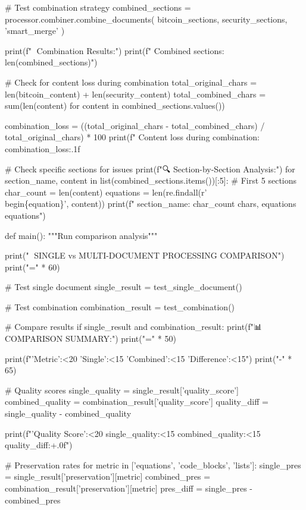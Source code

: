     # Test combination strategy
    combined_sections = processor.combiner.combine_documents(
        bitcoin_sections, security_sections, 'smart_merge'
    )
    
    print(f"\n🔄 Combination Results:")
    print(f"  Combined sections: {len(combined_sections)}")
    
    # Check for content loss during combination
    total_original_chars = len(bitcoin_content) + len(security_content)
    total_combined_chars = sum(len(content) for content in combined_sections.values())
    
    combination_loss = ((total_original_chars - total_combined_chars) / total_original_chars) * 100
    print(f"  Content loss during combination: {combination_loss:.1f}%
    
    # Check specific sections for issues
    print(f"\n🔍 Section-by-Section Analysis:")
    for section_name, content in list(combined_sections.items())[:5]:  # First 5 sections
        char_count = len(content)
        equations = len(re.findall(r'\\begin\{equation\}', content))
        print(f"  {section_name}: {char_count} chars, {equations} equations")

def main():
    """Run comparison analysis"""
    
    print("🧪 SINGLE vs MULTI-DOCUMENT PROCESSING COMPARISON")
    print("=" * 60)
    
    # Test single document
    single_result = test_single_document()
    
    # Test combination
    combination_result = test_combination()
    
    # Compare results
    if single_result and combination_result:
        print(f"\n📊 COMPARISON SUMMARY:")
        print("=" * 50)
        
        print(f"{'Metric':<20} {'Single':<15} {'Combined':<15} {'Difference':<15}")
        print("-" * 65)
        
        # Quality scores
        single_quality = single_result['quality_score']
        combined_quality = combination_result['quality_score']
        quality_diff = single_quality - combined_quality
        
        print(f"{'Quality Score':<20} {single_quality:<15} {combined_quality:<15} {quality_diff:+.0f}")
        
        # Preservation rates
        for metric in ['equations', 'code_blocks', 'lists']:
            single_pres = single_result['preservation'][metric]
            combined_pres = combination_result['preservation'][metric]
            pres_diff = single_pres - combined_pres
            
